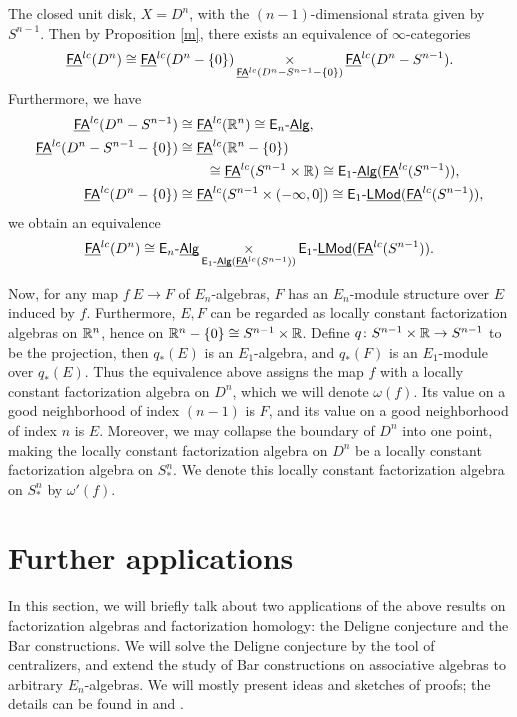\documentclass[twoside]{article}
\begin{document}
\begin{example}\label{q}
    The closed unit disk, $X=D^n$, with the $(n-1)$-dimensional strata given by 
    $S^{n-1}$. Then by Proposition \ref{m}, there exists an equivalence of 
    $\infty$-categories $$\underline{\smash{\mathsf{FA}}}^{lc}(D^n)\cong\underline{\smash{\mathsf{FA}}}^{lc}(D^n-\{0\})
    \mathop{\operatorname{\times}}\limits_{\underline{\smash{\mathsf{FA}}}^{lc}(D^n-S^{n-1}-\{0\})}
    \underline{\smash{\mathsf{FA}}}^{lc}(D^n-S^{n-1}).$$ Furthermore, we have $$\begin{aligned}
    \underline{\smash{\mathsf{FA}}}^{lc}(D^n-S^{n-1})&\cong\underline{\smash{\mathsf{FA}}}^{lc}(\mathbb{R}^n)\cong\mathsf{E}_n\text{-}\underline{\smash{\mathsf{Alg}}},\\
    \underline{\smash{\mathsf{FA}}}^{lc}(D^n-S^{n-1}-\{0\})&\cong\underline{\smash{\mathsf{FA}}}^{lc}(\mathbb{R}^n-\{0\})\\&\hspace{2em}\cong
    \underline{\smash{\mathsf{FA}}}^{lc}(S^{n-1}\times\mathbb{R})\cong\mathsf{E}_1\text{-}\underline{\smash{\mathsf{Alg}}}(\underline{\smash{\mathsf{FA}}}^{lc}(S^{n-1})),\\
    \underline{\smash{\mathsf{FA}}}^{lc}(D^n-\{0\})&\cong\underline{\smash{\mathsf{FA}}}^{lc}(S^{n-1}\times(-\infty,0])\cong
    \mathsf{E}_1\text{-}\underline{\smash{\mathsf{LMod}}}(\underline{\smash{\mathsf{FA}}}^{lc}(S^{n-1})),
    \end{aligned}$$ we obtain an equivalence $$\underline{\smash{\mathsf{FA}}}^{lc}(D^n)\cong\mathsf{E}_n\text{-}\underline{\smash{\mathsf{Alg}}}
    \mathop{\operatorname{\times}}\limits_{\mathsf{E}_1\text{-}\underline{\smash{\mathsf{Alg}}}(\underline{\smash{\mathsf{FA}}}^{lc}(S^{n-1}))}
    \mathsf{E}_1\text{-}\underline{\smash{\mathsf{LMod}}}(\underline{\smash{\mathsf{FA}}}^{lc}(S^{n-1})).$$

    Now, for any map $f\:E\to F$ of $E_n$-algebras, $F$ has an $E_n$-module
    structure over $E$ induced by $f$. Furthermore, $E,F$ can be regarded as locally
    constant factorization algebras on $\mathbb{R}^n$, hence on $\mathbb{R}^n-\{0\}\cong
    S^{n-1}\times\mathbb{R}$. Define $q\colon S^{n-1}\times\mathbb{R}\to S^{n-1}$ to be the projection,
    then $q_*(E)$ is an $E_1$-algebra, and $q_*(F)$ is an $E_1$-module over $q_*(E)$.
    Thus the equivalence above assigns the map $f$ with a locally constant
    factorization algebra on $D^n$, which we will denote $\omega(f)$. Its value
    on a good neighborhood of index $(n-1)$ is $F$, and its value
    on a good neighborhood of index $n$ is $E$. Moreover, we may collapse
    the boundary of $D^n$ into one point, making the locally constant factorization
    algebra on $D^n$ be a locally constant factorization algebra on $S^n_*$.
    We denote this locally constant factorization algebra on $S^n_*$ by
    $\omega'(f)$.
\end{example}

\section{Further applications}

In this section, we will briefly talk about two applications of the above
results on factorization algebras and factorization homology: the Deligne
conjecture and the Bar constructions. We will solve the Deligne conjecture
by the tool of centralizers, and extend the study of Bar constructions on
associative algebras to arbitrary $E_n$-algebras. We will mostly present ideas
and sketches of proofs; the details can be found in \cite{Fra11} and
\cite{GTZ12}.
\end{document}
